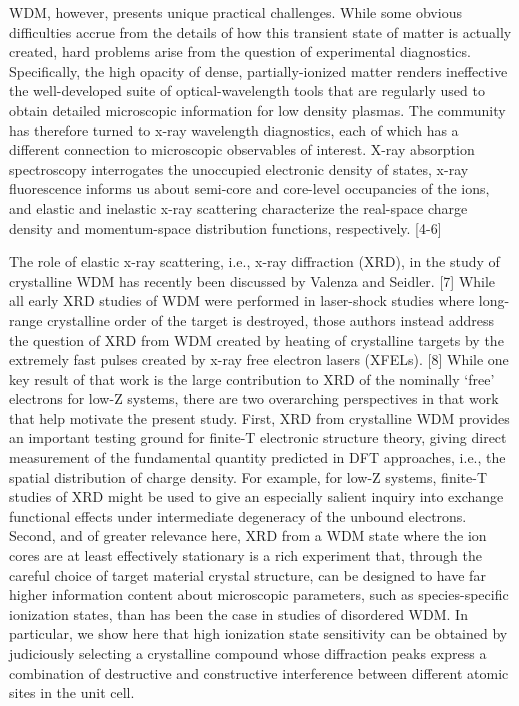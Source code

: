 WDM, however, presents unique practical challenges. While some obvious
difficulties accrue from the details of how this transient state of
matter is actually created, hard problems arise from the question of
experimental diagnostics. Specifically, the high opacity of dense,
partially-ionized matter renders ineffective the well-developed suite of
optical-wavelength tools that are regularly used to obtain detailed
microscopic information for low density plasmas. The community has
therefore turned to x-ray wavelength diagnostics, each of which has a
different connection to microscopic observables of interest. X-ray
absorption spectroscopy interrogates the unoccupied electronic density
of states, x-ray fluorescence informs us about semi-core and core-level
occupancies of the ions, and elastic and inelastic x-ray scattering
characterize the real-space charge density and momentum-space
distribution functions, respectively. {[}4-6{]}

The role of elastic x-ray scattering, i.e., x-ray diffraction (XRD), in
the study of crystalline WDM has recently been discussed by Valenza and
Seidler. {[}7{]} While all early XRD studies of WDM were performed in
laser-shock studies where long-range crystalline order of the target is
destroyed, those authors instead address the question of XRD from WDM
created by heating of crystalline targets by the extremely fast pulses
created by x-ray free electron lasers (XFELs). {[}8{]} While one key
result of that work is the large contribution to XRD of the nominally
`free' electrons for low-Z systems, there are two overarching
perspectives in that work that help motivate the present study. First,
XRD from crystalline WDM provides an important testing ground for
finite-T electronic structure theory, giving direct measurement of the
fundamental quantity predicted in DFT approaches, i.e., the spatial
distribution of charge density. For example, for low-Z systems, finite-T
studies of XRD might be used to give an especially salient inquiry into
exchange functional effects under intermediate degeneracy of the unbound
electrons. Second, and of greater relevance here, XRD from a WDM state
where the ion cores are at least effectively stationary is a rich
experiment that, through the careful choice of target material crystal
structure, can be designed to have far higher information content about
microscopic parameters, such as species-specific ionization states, than
has been the case in studies of disordered WDM. In particular, we show
here that high ionization state sensitivity can be obtained by
judiciously selecting a crystalline compound whose diffraction peaks
express a combination of destructive and constructive interference
between different atomic sites in the unit cell.

